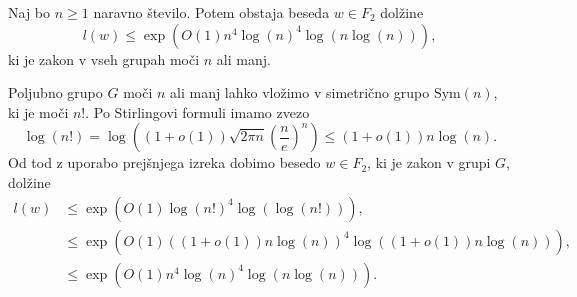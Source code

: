 \begin{posledica}\label{psl_zakon_v_splosni_grupi}
    Naj bo $n \ge 1$ naravno število. Potem obstaja beseda $w \in F_2$ dolžine \begin{equation*}
        l(w) \le \exp{\left( O(1) n^4 \log(n)^4 \log(n \log(n)) \right)},
    \end{equation*}
    ki je zakon v vseh grupah moči $n$ ali manj.
\end{posledica}
\begin{dokaz}
    Poljubno grupo $G$ moči $n$ ali manj lahko vložimo v simetrično grupo $\text{Sym}(n)$, ki je moči $n!$. Po Stirlingovi formuli imamo zvezo \begin{equation*}
       \log(n!) = \log \left( (1+ o(1)) \sqrt{2 \pi n} \left( \frac{n}{e} \right)^n   \right) \le (1 + o(1)) n \log(n).
    \end{equation*}
    Od tod z uporabo prejšnjega izreka dobimo besedo $w \in F_2$, ki je zakon v grupi $G$, dolžine \begin{align*}
        l(w) &\le  \exp{\left(O(1) \log(n!)^4 \log(\log(n!))\right)}, \\
            &\le \exp{\left(O(1) ((1 + o(1)) n \log(n))^4 \log((1 + o(1)) n \log(n))\right)}, \\
            &\le \exp{\left( O(1) n^4 \log(n)^4 \log(n \log(n)) \right)}.
    \end{align*}\end{dokaz}







